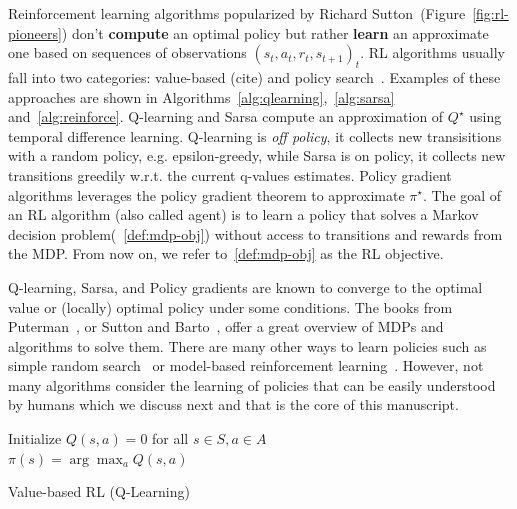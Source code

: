Reinforcement learning algorithms popularized by Richard Sutton~\cite{sutton}(Figure~\ref{fig:rl-pioneers}) don't \textbf{compute} an optimal policy but rather \textbf{learn} an approximate one based on sequences of observations ${(s_t, a_t, r_t, s_{t+1})}_t$.
RL algorithms usually fall into two categories: value-based (cite) and policy search~\cite{pg_sutton}.
Examples of these approaches are shown in Algorithms~\ref{alg:qlearning},~\ref{alg:sarsa} and~\ref{alg:reinforce}.
Q-learning and Sarsa compute an approximation of $Q^{\star}$ using temporal difference learning. Q-learning is \textit{off policy}, it collects new transisitions with a random policy, e.g. epsilon-greedy, while Sarsa is on policy, it collects new transitions greedily w.r.t. the current q-values estimates.
Policy gradient algorithms leverages the policy gradient theorem to approximate $\pi^{\star}$.
The goal of an RL algorithm (also called agent) is to learn a policy that solves a Markov decision problem(~\ref{def:mdp-obj}) without access to transitions and rewards from the MDP.
From now on, we refer to~\ref{def:mdp-obj} as the RL objective.

Q-learning, Sarsa, and Policy gradients are known to converge to the optimal value or (locally) optimal policy under some conditions.
The books from Puterman~\cite{puterman}, or Sutton and Barto~\cite{sutton}, offer a great overview of MDPs and algorithms to solve them.
There are many other ways to learn policies such as simple random search~\cite{random-search} or model-based reinforcement learning~\cite{dyna}. 
However, not many algorithms consider the learning of policies that can be easily understood by humans which we discuss next and that is the core of this manuscript.

\begin{algorithm}
    Initialize $Q(s,a) = 0$ for all $s \in S, a \in A$ \\
    $\pi(s) = \arg\max_a Q(s,a)$ 
    \caption{Value-based RL (Q-Learning)}\label{alg:qlearning}
\end{algorithm}


